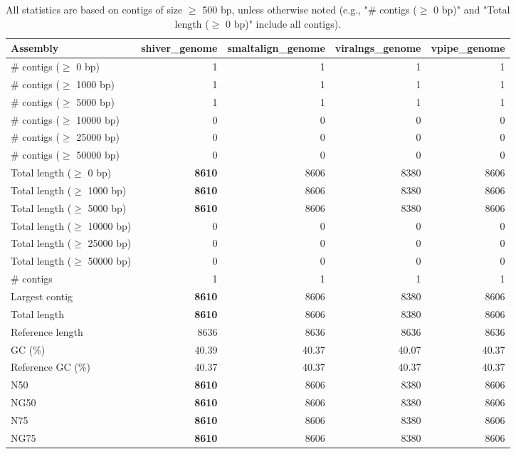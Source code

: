 \documentclass[12pt,a4paper]{article}
\begin{document}
\begin{table}[ht]
\begin{center}
\caption{All statistics are based on contigs of size $\geq$ 500 bp, unless otherwise noted (e.g., "\# contigs ($\geq$ 0 bp)" and "Total length ($\geq$ 0 bp)" include all contigs).}
\begin{tabular}{|l*{4}{|r}|}
\hline
Assembly & shiver\_genome & smaltalign\_genome & viralngs\_genome & vpipe\_genome \\ \hline
\# contigs ($\geq$ 0 bp) & 1 & 1 & 1 & 1 \\ \hline
\# contigs ($\geq$ 1000 bp) & 1 & 1 & 1 & 1 \\ \hline
\# contigs ($\geq$ 5000 bp) & 1 & 1 & 1 & 1 \\ \hline
\# contigs ($\geq$ 10000 bp) & 0 & 0 & 0 & 0 \\ \hline
\# contigs ($\geq$ 25000 bp) & 0 & 0 & 0 & 0 \\ \hline
\# contigs ($\geq$ 50000 bp) & 0 & 0 & 0 & 0 \\ \hline
Total length ($\geq$ 0 bp) & {\bf 8610} & 8606 & 8380 & 8606 \\ \hline
Total length ($\geq$ 1000 bp) & {\bf 8610} & 8606 & 8380 & 8606 \\ \hline
Total length ($\geq$ 5000 bp) & {\bf 8610} & 8606 & 8380 & 8606 \\ \hline
Total length ($\geq$ 10000 bp) & 0 & 0 & 0 & 0 \\ \hline
Total length ($\geq$ 25000 bp) & 0 & 0 & 0 & 0 \\ \hline
Total length ($\geq$ 50000 bp) & 0 & 0 & 0 & 0 \\ \hline
\# contigs & 1 & 1 & 1 & 1 \\ \hline
Largest contig & {\bf 8610} & 8606 & 8380 & 8606 \\ \hline
Total length & {\bf 8610} & 8606 & 8380 & 8606 \\ \hline
Reference length & 8636 & 8636 & 8636 & 8636 \\ \hline
GC (\%) & 40.39 & 40.37 & 40.07 & 40.37 \\ \hline
Reference GC (\%) & 40.37 & 40.37 & 40.37 & 40.37 \\ \hline
N50 & {\bf 8610} & 8606 & 8380 & 8606 \\ \hline
NG50 & {\bf 8610} & 8606 & 8380 & 8606 \\ \hline
N75 & {\bf 8610} & 8606 & 8380 & 8606 \\ \hline
NG75 & {\bf 8610} & 8606 & 8380 & 8606 \\ \hline

\end{tabular}
\end{center}
\end{table}
\end{document}

